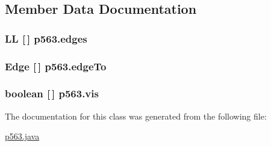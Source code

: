 \subsection{Member Data Documentation}
\hypertarget{classp563_a07f243c43eb4df6806247f1f4af97b5a}{
\subsubsection[{edges}]{\setlength{\rightskip}{0pt plus 5cm}LL \mbox{[}$\,$\mbox{]} {\bf p563.edges}}}
\label{classp563_a07f243c43eb4df6806247f1f4af97b5a}
\hypertarget{classp563_a0cc692a892ddcf0725f3f08d27a773e7}{
\subsubsection[{edgeTo}]{\setlength{\rightskip}{0pt plus 5cm}Edge \mbox{[}$\,$\mbox{]} {\bf p563.edgeTo}}}
\label{classp563_a0cc692a892ddcf0725f3f08d27a773e7}
\hypertarget{classp563_a0f8bbcf33059eee850855a9cf716813a}{
\subsubsection[{vis}]{\setlength{\rightskip}{0pt plus 5cm}boolean \mbox{[}$\,$\mbox{]} {\bf p563.vis}}}
\label{classp563_a0f8bbcf33059eee850855a9cf716813a}


The documentation for this class was generated from the following file:\begin{DoxyCompactItemize}
\item 
\hyperlink{p563_8java}{p563.java}\end{DoxyCompactItemize}
